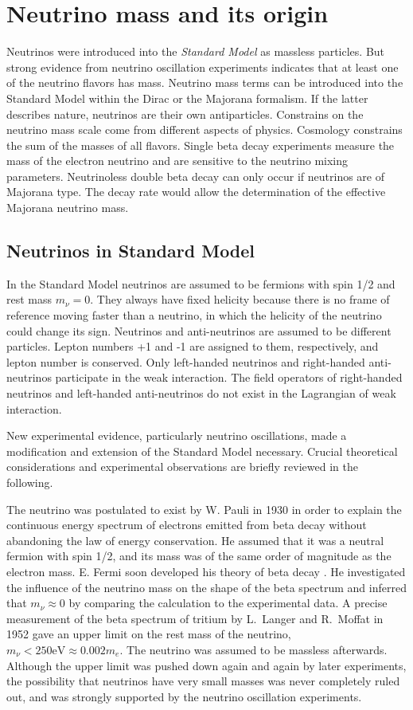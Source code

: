 \chapter{Neutrino mass and its origin}
\label{cha:theory}
Neutrinos were introduced into the \emph{Standard Model} as massless particles. But strong evidence from neutrino oscillation experiments indicates that at least one of the neutrino flavors has mass. Neutrino mass terms can be introduced into the Standard Model within the Dirac or the Majorana formalism. If the latter describes nature, neutrinos are their own antiparticles. Constrains on the neutrino mass scale come from different aspects of physics. Cosmology constrains the sum of the masses of all flavors. Single beta decay experiments measure the mass of the electron neutrino and are sensitive to the neutrino mixing parameters. Neutrinoless double beta decay can only occur if neutrinos are of Majorana type. The decay rate would allow the determination of the effective Majorana neutrino mass.

\section{Neutrinos in Standard Model}
\label{sec:sm}
In the Standard Model neutrinos are assumed to be fermions with spin 1/2 and rest mass $m_\nu=0$. They always have fixed helicity because there is no frame of reference moving faster than a neutrino, in which the helicity of the neutrino could change its sign. Neutrinos and anti-neutrinos are assumed to be different particles. Lepton numbers +1 and -1 are assigned to them, respectively, and lepton number is conserved. Only left-handed neutrinos and right-handed anti-neutrinos participate in the weak interaction. The field operators of right-handed neutrinos and left-handed anti-neutrinos do not exist in the Lagrangian of weak interaction.

New experimental evidence, particularly neutrino oscillations, made a modification and extension of the Standard Model necessary. Crucial theoretical considerations and experimental observations are briefly reviewed in the following.

The neutrino was postulated to exist by W. Pauli in 1930 \cite{Pau30} in order to explain the continuous energy spectrum of electrons emitted from beta decay without abandoning the law of energy conservation. He assumed that it was a neutral fermion with spin 1/2, and its mass was of the same order of magnitude as the electron mass. E.  Fermi soon developed his theory of beta decay \cite{Fer33, Fer34}. He investigated the influence of the neutrino mass on the shape of the beta spectrum and inferred that $m_\nu \approx 0$ by comparing the calculation to the experimental data. A precise measurement of the beta spectrum of tritium by L.~Langer and R.~Moffat in 1952 \cite{Lan52} gave an upper limit on the rest mass of the neutrino, $m_\nu < 250 \mbox{eV} \approx 0.002m_e$. The neutrino was assumed to be massless afterwards. Although the upper limit was pushed down again and again by later experiments, the possibility that neutrinos have very small masses was never completely ruled out, and was strongly supported by the neutrino oscillation experiments.

